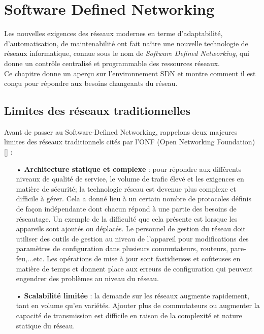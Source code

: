 \mainmatter
\chapter{Software Defined Networking} 

\label{Chapter1} 

Les nouvelles exigences des réseaux modernes en terme d’adaptabilité, d’automatisation, de maintenabilité ont fait naître une nouvelle technologie de réseaux informatique, connue sous le nom de \textit{Software Defined Networking}, qui donne un contrôle centralisé et programmable des ressources réseaux.\\
Ce chapitre donne un aperçu sur l’environnement SDN et montre comment il est conçu  pour répondre aux besoins changeants du réseau.

\section{Limites des réseaux traditionnelles}
Avant de passer au Software-Defined Networking, rappelons deux majeures limites des réseaux traditionnels cités par l'ONF (Open Networking Foundation) [\cite{1}] :\\
\begin{itemize}
\item[•] \textbf{Architecture statique et complexe} : pour répondre aux différents niveaux de qualité de service, le volume de trafic élevé et les exigences en matière de sécurité; la technologie réseau est devenue plus complexe et difficile à gérer. Cela a donné lieu à un certain nombre de protocoles définis de façon indépendante dont chacun répond à une partie des besoins de réseautage. Un exemple de la difficulté que cela présente est lorsque les appareils sont ajoutés ou déplacés. Le personnel de gestion du réseau doit utiliser des outils de gestion au niveau de l’appareil pour modifications des paramètres de configuration dans plusieurs commutateurs, routeurs, pare-feu,...etc. Les opérations de mise à jour sont fastidieuses et coûteuses en matière de temps et donnent place aux erreurs de configuration qui peuvent engendrer des problèmes au niveau du réseau.\\
\item[•] \textbf{Scalabilité limitée} : la demande sur les réseaux augmente rapidement, tant en volume qu’en variétés. Ajouter plus de commutateurs ou augmenter la capacité de transmission est difficile en raison de la complexité et nature statique du réseau.
\end{itemize}

